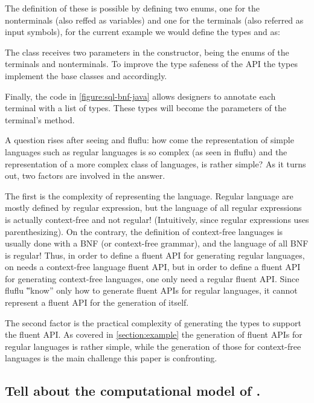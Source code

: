 The definition of these is possible by defining two \Java enums, one for the
nonterminals (also reffed as variables) and one for the terminals (also
referred as input symbols), for the current example we would define the types
 and  as:

\begin{quote}
  \parbox[c]{43ex}{}
\end{quote}


The  class receives two parameters in the constructor, being the enums
  of the terminals and nonterminals.
To improve the type safeness of the API the types implement the base classes
   and  accordingly.

Finally, the code in \cref{figure:sql-bnf-java} allows designers to annotate
  each terminal with a list of types.
These types will become the parameters of the terminal's method.

A question rises after seeing \Fajita and fluflu: how come the representation
of simple languages such as regular languages is so complex (as seen in fluflu)
and the representation of a more complex class of languages, is rather simple?
As it turns out, two factors are involved in the answer.

The first is the complexity of representing the language.
Regular language are mostly defined by regular expression, but the language of
  all regular expressions is actually context-free and not regular!
  (Intuitively, since regular expressions uses parenthesizing). On the contrary,
  the definition of context-free languages is usually done with a BNF (or
  context-free grammar), and the language of all BNF is regular!
Thus, in order to define a fluent API for generating regular languages, on needs a
  context-free language fluent API, but in order to define a fluent API for
  generating context-free languages, one only need a regular fluent API.
Since fluflu ‟know” only how to generate fluent APIs for regular languages,
  it cannot represent a fluent API for the generation of itself.

The second factor is the practical complexity of generating the \Java types to
support the fluent API. As covered in \cref{section:example} the generation of
fluent APIs for regular languages is rather simple, while the generation of
those for context-free languages is the main challenge this paper is
confronting.

\subsection{Tell about the computational model of \CC.}

